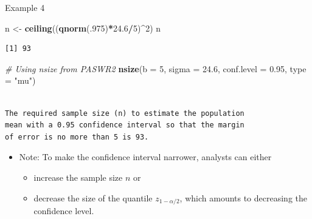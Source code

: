 \documentclass[
  ignorenonframetext,
]{beamer}
\newenvironment{Shaded}{\begin{snugshade}}{\end{snugshade}}
\newcommand{\AttributeTok}[1]{\textcolor[rgb]{0.13,0.29,0.53}{#1}}
\newcommand{\CommentTok}[1]{\textcolor[rgb]{0.56,0.35,0.01}{\textit{#1}}}
\newcommand{\DecValTok}[1]{\textcolor[rgb]{0.00,0.00,0.81}{#1}}
\newcommand{\FloatTok}[1]{\textcolor[rgb]{0.00,0.00,0.81}{#1}}
\newcommand{\FunctionTok}[1]{\textcolor[rgb]{0.13,0.29,0.53}{\textbf{#1}}}
\newcommand{\NormalTok}[1]{#1}
\newcommand{\OtherTok}[1]{\textcolor[rgb]{0.56,0.35,0.01}{#1}}
\newcommand{\SpecialCharTok}[1]{\textcolor[rgb]{0.81,0.36,0.00}{\textbf{#1}}}
\newcommand{\StringTok}[1]{\textcolor[rgb]{0.31,0.60,0.02}{#1}}
\providecommand{\tightlist}{%
  \setlength{\itemsep}{0pt}\setlength{\parskip}{0pt}}
\begin{document}
\begin{frame}[fragile]{Example 4}
\protect\hypertarget{example-4-1}{}
\tiny

\begin{Shaded}
\begin{Highlighting}[]
\NormalTok{n }\OtherTok{\textless{}{-}} \FunctionTok{ceiling}\NormalTok{((}\FunctionTok{qnorm}\NormalTok{(.}\DecValTok{975}\NormalTok{)}\SpecialCharTok{*}\FloatTok{24.6}\SpecialCharTok{/}\DecValTok{5}\NormalTok{)}\SpecialCharTok{\^{}}\DecValTok{2}\NormalTok{)}
\NormalTok{n}
\end{Highlighting}
\end{Shaded}

\begin{verbatim}
[1] 93
\end{verbatim}

\begin{Shaded}
\begin{Highlighting}[]
\CommentTok{\# Using nsize from PASWR2}
\FunctionTok{nsize}\NormalTok{(}\AttributeTok{b =} \DecValTok{5}\NormalTok{, }\AttributeTok{sigma =} \FloatTok{24.6}\NormalTok{, }\AttributeTok{conf.level =} \FloatTok{0.95}\NormalTok{, }\AttributeTok{type =} \StringTok{"mu"}\NormalTok{)}
\end{Highlighting}
\end{Shaded}

\begin{verbatim}

The required sample size (n) to estimate the population 
mean with a 0.95 confidence interval so that the margin 
of error is no more than 5 is 93.
\end{verbatim}

\normalsize

\begin{itemize}
\item
  Note: To make the confidence interval narrower, analysts can either

  \begin{itemize}
  \tightlist
  \item
    increase the sample size \(n\) or
  \item
    decrease the size of the quantile \(z_{1-\alpha/2}\), which amounts
    to decreasing the confidence level.
  \end{itemize}
\end{itemize}
\end{frame}
\end{document}
